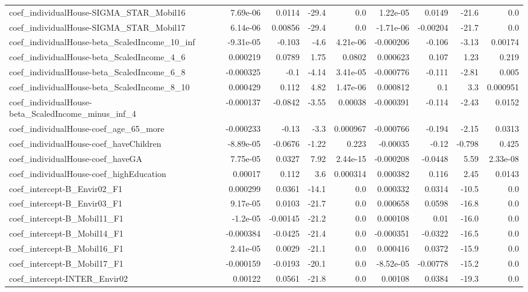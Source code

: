 \begin{tabular}{lrrrrrrrr}
coef_individualHouse-SIGMA_STAR_Mobil16 & 7.69e-06 & 0.0114 & -29.4 & 0.0 & 1.22e-05 & 0.0149 & -21.6 & 0.0 \\
coef_individualHouse-SIGMA_STAR_Mobil17 & 6.14e-06 & 0.00856 & -29.4 & 0.0 & -1.71e-06 & -0.00204 & -21.7 & 0.0 \\
coef_individualHouse-beta_ScaledIncome_10_inf & -9.31e-05 & -0.103 & -4.6 & 4.21e-06 & -0.000206 & -0.106 & -3.13 & 0.00174 \\
coef_individualHouse-beta_ScaledIncome_4_6 & 0.000219 & 0.0789 & 1.75 & 0.0802 & 0.000623 & 0.107 & 1.23 & 0.219 \\
coef_individualHouse-beta_ScaledIncome_6_8 & -0.000325 & -0.1 & -4.14 & 3.41e-05 & -0.000776 & -0.111 & -2.81 & 0.005 \\
coef_individualHouse-beta_ScaledIncome_8_10 & 0.000429 & 0.112 & 4.82 & 1.47e-06 & 0.000812 & 0.1 & 3.3 & 0.000951 \\
coef_individualHouse-beta_ScaledIncome_minus_inf_4 & -0.000137 & -0.0842 & -3.55 & 0.00038 & -0.000391 & -0.114 & -2.43 & 0.0152 \\
coef_individualHouse-coef_age_65_more & -0.000233 & -0.13 & -3.3 & 0.000967 & -0.000766 & -0.194 & -2.15 & 0.0313 \\
coef_individualHouse-coef_haveChildren & -8.89e-05 & -0.0676 & -1.22 & 0.223 & -0.00035 & -0.12 & -0.798 & 0.425 \\
coef_individualHouse-coef_haveGA & 7.75e-05 & 0.0327 & 7.92 & 2.44e-15 & -0.000208 & -0.0448 & 5.59 & 2.33e-08 \\
coef_individualHouse-coef_highEducation & 0.00017 & 0.112 & 3.6 & 0.000314 & 0.000382 & 0.116 & 2.45 & 0.0143 \\
coef_intercept-B_Envir02_F1 & 0.000299 & 0.0361 & -14.1 & 0.0 & 0.000332 & 0.0314 & -10.5 & 0.0 \\
coef_intercept-B_Envir03_F1 & 9.17e-05 & 0.0103 & -21.7 & 0.0 & 0.000658 & 0.0598 & -16.8 & 0.0 \\
coef_intercept-B_Mobil11_F1 & -1.2e-05 & -0.00145 & -21.2 & 0.0 & 0.000108 & 0.01 & -16.0 & 0.0 \\
coef_intercept-B_Mobil14_F1 & -0.000384 & -0.0425 & -21.4 & 0.0 & -0.000351 & -0.0322 & -16.5 & 0.0 \\
coef_intercept-B_Mobil16_F1 & 2.41e-05 & 0.0029 & -21.1 & 0.0 & 0.000416 & 0.0372 & -15.9 & 0.0 \\
coef_intercept-B_Mobil17_F1 & -0.000159 & -0.0193 & -20.1 & 0.0 & -8.52e-05 & -0.00778 & -15.2 & 0.0 \\
coef_intercept-INTER_Envir02 & 0.00122 & 0.0561 & -21.8 & 0.0 & 0.00108 & 0.0384 & -19.3 & 0.0 \\

\end{tabular}
